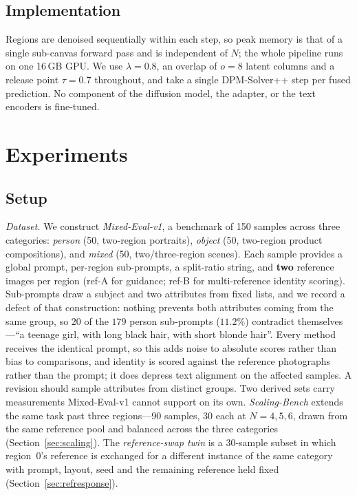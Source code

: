 \documentclass[review,10pt,times]{elsarticle}
\begin{document}
\subsection{Implementation}
\label{sec:method_impl}

Regions are denoised sequentially within each step, so peak memory is
that of a single sub-canvas forward pass and is independent of $N$;
the whole pipeline runs on one 16\,GB GPU.  We use $\lambda=0.8$, an
overlap of $o=8$ latent columns and a release point $\tau=0.7$
throughout, and take a single DPM-Solver++ step per fused prediction.
No component of the diffusion model, the adapter, or the text encoders
is fine-tuned.

\section{Experiments}
\label{sec:exp}

\subsection{Setup}

\noindent\textit{Dataset.}
We construct \emph{Mixed-Eval-v1}, a benchmark of 150 samples across
three categories: \emph{person} (50, two-region portraits),
\emph{object} (50, two-region product compositions), and \emph{mixed}
(50, two/three-region scenes).  Each sample provides a global prompt,
per-region sub-prompts, a split-ratio string, and \textbf{two}
reference images per region (ref-A for guidance; ref-B for
multi-reference identity scoring).
Sub-prompts draw a subject and two attributes from fixed lists, and we record
a defect of that construction: nothing prevents both attributes coming from
the same group, so $20$ of the $179$ person sub-prompts ($11.2\%$) contradict
themselves---``a teenage girl, with long black hair, with short blonde hair''.
Every method receives the identical prompt, so this adds noise to absolute
scores rather than bias to comparisons, and identity is scored against the
reference photographs rather than the prompt; it does depress text alignment
on the affected samples.  A revision should sample attributes from distinct
groups.
Two derived sets carry measurements Mixed-Eval-v1 cannot support on its own.
\emph{Scaling-Bench} extends the same task past three regions---90 samples,
30 each at $N{=}4,5,6$, drawn from the same reference pool and balanced
across the three categories (Section~\ref{sec:scaling}).  The
\emph{reference-swap twin} is a 30-sample subset in which region~0's
reference is exchanged for a different instance of the same category with
prompt, layout, seed and the remaining reference held fixed
(Section~\ref{sec:refresponse}).
\end{document}
